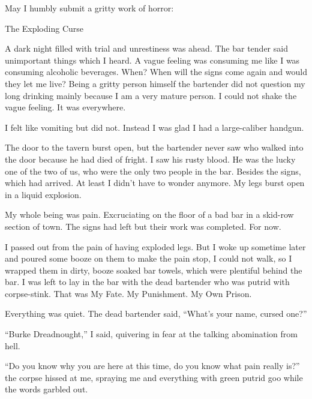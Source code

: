 

May I humbly submit a gritty work of horror:



The Exploding Curse



A dark night filled with trial and unrestiness was ahead. The bar
tender said unimportant things which I heard. A vague feeling was
consuming me like I was consuming alcoholic beverages. When? When
will the signs come again and would they let me live? Being a
gritty person himself the bartender did not question my long
drinking mainly because I am a very mature person. I could not
shake the vague feeling. It was everywhere.



I felt like vomiting but did not. Instead I was glad I had a
large-caliber handgun.



The door to the tavern burst open, but the bartender never saw who
walked into the door because he had died of fright. I saw his rusty
blood. He was the lucky one of the two of us, who were the only two
people in the bar. Besides the signs, which had arrived. At least I
didn't have to wonder anymore. My legs burst open in a liquid
explosion.



My whole being was pain. Excruciating on the floor of a bad bar in
a skid-row section of town. The signs had left but their work was
completed. For now.



I passed out from the pain of having exploded legs. But I woke up
sometime later and poured some booze on them to make the pain stop,
I could not walk, so I wrapped them in dirty, booze soaked bar
towels, which were plentiful behind the bar. I was left to lay in
the bar with the dead bartender who was putrid with corpse-stink.
That was My Fate. My Punishment. My Own Prison.



Everything was quiet. The dead bartender said, ``What's your name,
cursed one?''



``Burke Dreadnought,'' I said, quivering in fear at the talking
abomination from hell.



``Do you know why you are here at this time, do you know what pain
really is?'' the corpse hissed at me, spraying me and everything
with green putrid goo while the words garbled out.



